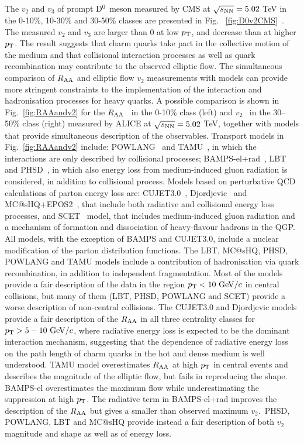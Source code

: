 The $v_2$ and $v_3$ of prompt ${\rm D^0}$ meson measured by CMS at $\sqrt{s_{\rm NN}} = 5.02 $ TeV in the 0-10\%, 
10-30\% and 30-50\% classes are presented in 
Fig.~	\ref{fig:D0v2CMS}~\cite{Sirunyan:2017plt}. 
The measured $v_2$ and $v_3$ are larger than 0 
at low $p_{\rm T}$, and decrease than at higher $p_{\rm T}$.
The result suggests that charm quarks take part in 
the collective motion of the medium and that collisional interaction processes as well as quark 
recombination may contribute to the observed elliptic flow. 
The simultaneous comparison of $R_{\rm AA}$ and elliptic flow $v_2$ measurements 
with models can provide more stringent constraints to the implementation of the 
interaction and hadronisation processes for heavy quarks. 
A possible comparison is shown in Fig.~\ref{fig:RAAandv2} for the $R_{\rm AA}$~\cite{ALICE-PUBLIC-2017-003} 
in the 0-10\% class (left) and $v_2$~\cite{Acharya:2017qps} in the 30--50\% class (right) measured
by ALICE at $\sqrt{s_{\rm NN}} = 5.02$ TeV, 
together with models that provide simultaneous description of the observables.
Transport models in Fig.~\ref{fig:RAAandv2} include: 
POWLANG~\cite{Beraudo:2014boa} and TAMU~\cite{He:2014cla}, 
in which the interactions are only described by collisional processes; 
BAMPS-el+rad~\cite{Uphoff:2014hza}, LBT~\cite{Cao:2017hhk} and 
PHSD~\cite{Song:2015ykw}, in which also energy loss from medium-induced gluon radiation
is considered, in addition to collisional process.
Models based on perturbative QCD calculations of parton energy loss 
are: CUJET3.0~\cite{Xu:2015bbz}, Djordjevic~\cite{Djordjevic:2015hra} 
and MC@sHQ+EPOS2~\cite{Nahrgang:2013xaa}, that include both radiative 
and collisional energy loss processes, and SCET~\cite{Kang:2016ofv} model, that includes 
medium-induced gluon radiation and a mechanism of formation and dissociation of 
heavy-flavour hadrons in the QGP. All models, with the exception of BAMPS and CUJET3.0, 
include a nuclear modification of the parton distribution functions.
The LBT, MC@sHQ, PHSD, POWLANG and TAMU
models include a contribution of hadronisation via quark recombination, 
in addition to independent fragmentation. 
Most of the models provide a fair description of the data in the region 
$p_{\rm T}<10~\mathrm{GeV}/c$ in central collisions, 
but many of them (LBT, PHSD, POWLANG and SCET) provide a worse 
description of non-central collisions.
The CUJET3.0 and Djordjevic models provide a fair description of the $R_{\rm AA}$ in all three 
centrality classes for $p_{\rm T} > 5-10~\mathrm{GeV}/c$, where radiative energy loss 
is expected to be the dominant interaction mechanism, suggesting that 
the dependence of radiative energy loss on the path length of charm 
quarks in the hot and dense medium is well understood. 
TAMU model overestimates $R_{\rm AA}$ at high $p_{\rm T}$ in central events and describes 
the magnitude of the elliptic flow, but fails in reproducing the shape.
BAMPS-el overestimates the maximum flow while underestimating the 
suppression at high $p_{\rm T}$. The radiative term in BAMPS-el+rad improves the 
description of the $R_{\rm AA}$ but gives a smaller than observed maximum 
$v_2$.~PHSD, POWLANG, LBT and MC@sHQ provide instead a fair 
description of both $v_2$ magnitude and shape
as well as of energy loss.



